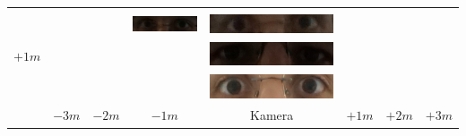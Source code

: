 \begin{tabular}{|c|c|c|c|c|c|c|c|}
&
\\&
&
&
\includegraphics[width=0.115\linewidth]{Auge1/A_Img2-3ThomasE.png} &
\includegraphics[width=0.115\linewidth]{Auge1/A_Img2-4ThomasE.png} &
&
&
\\\hline 
$+1m$&
&
&
&
\includegraphics[width=0.115\linewidth]{Auge1/A_Img1-4FalkoE.png} &
&
&
\\&
&
&
&
\includegraphics[width=0.115\linewidth]{Auge1/A_Img1-4ThomasE.png} &
&
&
\\\hline
&$-3m$&$-2m$&$-1m$&Kamera&$+1m$&$+2m$&$+3m$\\\hline
\end{tabular}